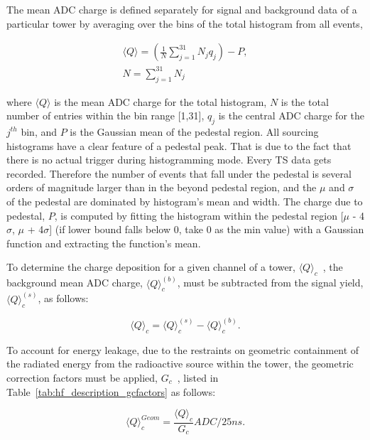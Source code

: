 The mean ADC charge is defined separately for signal and background data of a
particular tower by averaging over the bins of the total histogram from all
events,
\begin{center}
   \begin{eqnarray}
      \label{eq:Histo_Avg}
      \langle{Q}\rangle = (\frac{1}{N} \sum\limits_{j=1}^{31} N_{j}q_{j}) - P, \\
      N = \sum\limits_{j=1}^{31} N_j \nonumber
   \end{eqnarray}
\end{center}

where $\langle{Q}\rangle$ is the mean ADC charge for the total histogram,
$N$ is the total number of entries within the bin range [1,31], $q_j$ is
the central ADC charge for the $j^{th}$ bin, and $P$ is the Gaussian mean of
the pedestal region. All sourcing histograms have a clear feature of a pedestal
peak. That is due to the fact that there is no actual trigger during
histogramming mode. Every TS data gets recorded. Therefore the number of events
that fall under the pedestal is several orders of magnitude larger than in the
beyond pedestal region, and the $\mu$ and $\sigma$ of the pedestal are dominated
by histogram's mean and width. The charge due to pedestal, $P$, is computed by fitting the histogram within the pedestal region [$\mu$ - 4$\sigma$, $\mu$ + 4$\sigma$] (if lower bound falls below 0, take 0 as the min value) with a Gaussian function and extracting the function's mean.

To determine the charge deposition for a given channel of a tower,
${\langle{Q}\rangle}_c$~, the background mean ADC
charge, ${\langle{Q}\rangle}^{(b)}_{c}$, must be subtracted from the signal yield,
${\langle{Q}\rangle}^{(s)}_{c}$, as follows:
\begin{center}
   \begin{equation}
      \label{eq:Sig_Min_Bkg}
      {\langle{Q}\rangle}_{c} = {\langle{Q}\rangle}^{(s)}_{c} - {\langle{Q}\rangle}^{(b)}_{c}.
   \end{equation}
\end{center}

To account for energy leakage, due to the restraints on geometric
containment of the radiated energy from the radioactive source within the tower,
the geometric correction factors must be applied, $G_c$~, listed in
Table~\ref{tab:hf_description_gcfactors} as follows:
\begin{center}
   \begin{equation}
      \label{eq:Sig_Corr}
      {\langle{Q}\rangle}^{Geom}_{c} = \frac{{\langle{Q}\rangle}_{c}}{G_{c}}\unit{ADC/25ns}.
   \end{equation}
\end{center}

